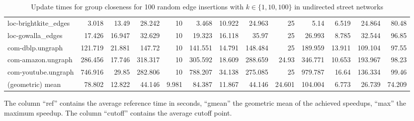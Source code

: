 \begin{landscape}
\begin{table}[h!]
\begin{tabular}{l|rrrr|rrrr|rrrr}
 loc-brightkite\_edges &   3.018 &  13.49  &  28.242 &   10     &   3.468 &  10.922 &  24.963 &   25     &   5.14  &   6.519 &  24.864 &   80.48  \\
 loc-gowalla\_edges    &  17.426 &  16.947 &  32.629 &   10     &  19.323 &  16.118 &  35.97  &   25     &  26.993 &   8.785 &  32.544 &   96.85  \\
 com-dblp.ungraph     & 121.719 &  21.881 & 147.72  &   10     & 141.551 &  14.791 & 148.484 &   25     & 189.959 &  13.911 & 109.104 &   97.55  \\
 com-amazon.ungraph   & 286.456 &  17.746 & 318.317 &   10     & 305.592 &  18.609 & 288.659 &   24.93  & 346.771 &  10.653 & 193.967 &   98.23  \\
 com-youtube.ungraph  & 746.916 &  29.85  & 282.806 &   10     & 788.207 &  34.138 & 275.085 &   25     & 979.787 &  16.64  & 136.334 &   99.46  \\ \midrule \midrule
 (geometric) mean     &  78.802 &  12.822 &  44.146 &    9.981 &  84.387 &  11.867 &  44.146 &   24.601 & 104.004 &   6.773 &  26.739 &   74.209 \\
\bottomrule
\end{tabular}
\caption{Update times for group closeness for 100 random edge insertions with  $k \in \{1, 10, 100\}$ in undirected street networks}{The column ``ref'' contains the average reference time in seconds, ``gmean'' the geometric mean of the achieved speedups, ``max'' the maximum speedup. The column ``cutoff'' contains the average cutoff point.}
\label{tbl:groupClosenessResults}
\end{table}	
\end{landscape}


